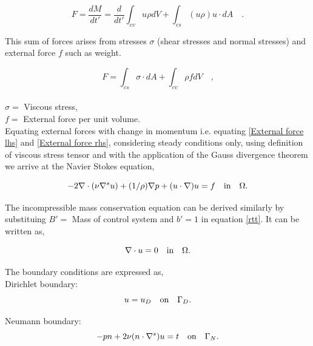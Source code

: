 \documentclass[a4paper,twoside,openright]{book}
\begin{document}
\begin{equation}\label{External force lhs}
F = \frac{dM}{dt'} = \frac{d}{dt'} \int_{cv} u \rho dV + \int_{cs} (u \rho) u\cdot dA \quad \textrm{.}
\end{equation}

This sum of forces arises from stresses $\sigma$ (shear stresses and normal stresses) and external force $f$ such as weight. 

\begin{equation}\label{External force rhs}
F = \int_{cs} \sigma \cdot dA + \int_{cv} \rho f dV \quad \textrm{,}
\end{equation}
\\
$\sigma =$ Viscous stress,\\
$f =$ External force per unit volume.\\

Equating external forces with change in momentum i.e. equating \eqref{External force lhs} and \eqref{External force rhs}, considering steady conditions only, using definition of viscous stress tensor and with the application of the Gauss divergence theorem we arrive at the Navier Stokes equation,

\begin{equation} \label{navier_stokes}
-2\nabla \cdot (\nu \nabla^s u) + (1/\rho) \nabla p + (u \cdot \nabla)u = f \quad   \textnormal{in}  \quad \Omega \textrm{.}
\end{equation} 

The incompressible mass conservation equation can be derived similarly by substituing $B' =$ Mass of control system and $b' = 1$ in equation \eqref{rtt}.  It can be written as,

\begin{equation}\label{mass_conservation}
\nabla \cdot u=0 \quad   \textnormal{in}  \quad \Omega \textrm{.}
\end{equation}

The boundary conditions are expressed as,\\

Dirichlet boundary:
\begin{equation}\label{dirichlet_ns}
u=u_D \quad \textnormal{on} \quad \Gamma_D \textrm{.}
\end{equation}

Neumann boundary:
\begin{equation} \label{neumann_ns}
-pn + 2\nu(n \cdot \nabla^s)u = t \quad   \textnormal{on}  \quad \Gamma_N \textrm{.}
\end{equation}
\end{document}
